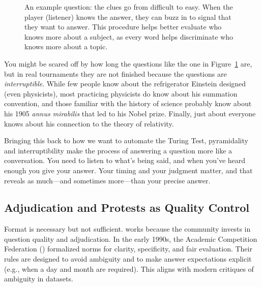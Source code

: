 \begin{figure}

\caption{An example \quizbowl{} question: the clues go from difficult
  to easy.  When the player (listener) knows the answer, they can buzz
  in to signal that they want to answer.  This procedure helps better
  evaluate who knows more about a subject, as every word helps
  discriminate who knows more about a topic.}

\label{fig:ex-qb}
\end{figure}

You might be scared off by how long the questions like the one in
Figure~\ref{fig:ex-qb} are, but in real \qb{} tournaments they are not
finished because the questions are \emph{interruptible}.
%
While few people know about the refrigerator Einstein designed (even
physicists), most practicing physicists do know about his summation
convention, and those familiar with the history of science probably
know about his 1905 \textit{annus mirabilis} that led to his Nobel
prize.  Finally, just about everyone knows about his connection to the
theory of relativity.

Bringing this back to how we want to automate the Turing Test,
pyramidality and interruptibility make the process of answering a
question more like a conversation.
%
You need to listen to what's being said, and when you've heard enough
you give your answer.
%
Your timing and your judgment matter, and that reveals as much---and
sometimes more---than your precise answer.

\subsection{Adjudication and Protests as Quality Control}
\label{sec:manchester:qb-adjudication}

Format is necessary but not sufficient. \quizbowl{} works because the community
invests in question quality and adjudication. In the early 1990s, the Academic
Competition Federation () formalized norms for clarity, specificity,
and fair evaluation. Their rules are designed to avoid ambiguity and to make
answer expectations explicit (e.g., when a day and month are required). This
aligns with modern critiques of ambiguity in  datasets.

